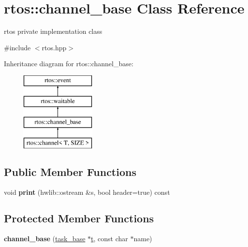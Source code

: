 \hypertarget{classrtos_1_1channel__base}{}\section{rtos\+:\+:channel\+\_\+base Class Reference}
\label{classrtos_1_1channel__base}


rtos private implementation class  




{\ttfamily \#include $<$rtos.\+hpp$>$}

Inheritance diagram for rtos\+:\+:channel\+\_\+base\+:\begin{figure}[H]
\begin{center}
\leavevmode
\includegraphics[height=4.000000cm]{classrtos_1_1channel__base}
\end{center}
\end{figure}
\subsection*{Public Member Functions}
\begin{DoxyCompactItemize}
\item 
void {\bfseries print} (hwlib\+::ostream \&s, bool header=true) const \hypertarget{classrtos_1_1channel__base_a2937877b07fe65fe2d3d6d69faddd9a4}{}\label{classrtos_1_1channel__base_a2937877b07fe65fe2d3d6d69faddd9a4}

\end{DoxyCompactItemize}
\subsection*{Protected Member Functions}
\begin{DoxyCompactItemize}
\item 
{\bfseries channel\+\_\+base} (\hyperlink{classrtos_1_1task__base}{task\+\_\+base} $\ast$\hyperlink{classrtos_1_1event_aa83745aabc941145f00386fd63f6b557}{t}, const char $\ast$name)\hypertarget{classrtos_1_1channel__base_a9dc28836c33737a1c14d3cac0263d07c}{}\label{classrtos_1_1channel__base_a9dc28836c33737a1c14d3cac0263d07c}

\end{DoxyCompactItemize}
